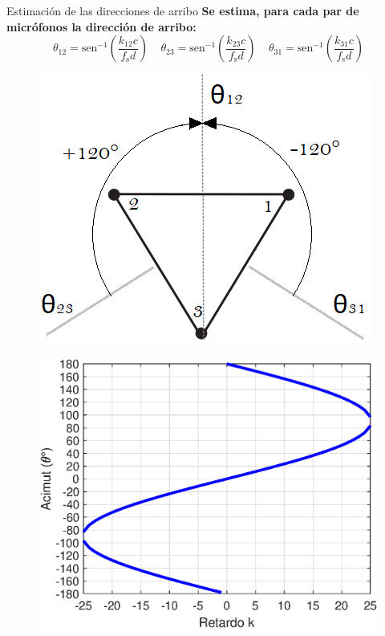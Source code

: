 \documentclass[12pt,aspectratio=169]{beamer}
\begin{document}
	\begin{frame}{Estimación de las direcciones de arribo}
		\textbf{Se estima, para cada par de micrófonos la dirección de arribo:}
		\begin{equation}
			\theta_{12} = \mathrm{sen}^{-1}\left(\frac{k_{12}c}{f_\mathrm{s}d}\right)~~~~~\theta_{23} = \mathrm{sen}^{-1}\left(\frac{k_{23}c}{f_\mathrm{s}d}\right)~~~~~\theta_{31} = \mathrm{sen}^{-1}\left(\frac{k_{31}c}{f_\mathrm{s}d}\right)
		\end{equation}		
		\hspace{5mm}		
		\begin{minipage}{50mm}
			\begin{figure}[h]
				\centering
				\includegraphics[width=\linewidth]{figures/reference}
			\end{figure}
		\end{minipage}
		\hspace{20mm}
		\begin{minipage}{70mm}
			\begin{figure}[h]
				\centering
				\includegraphics[width=0.9\linewidth]{figures/DOAvsDelay.eps}
			\end{figure}
		\end{minipage}
		
	\end{frame}
	
\end{document}
